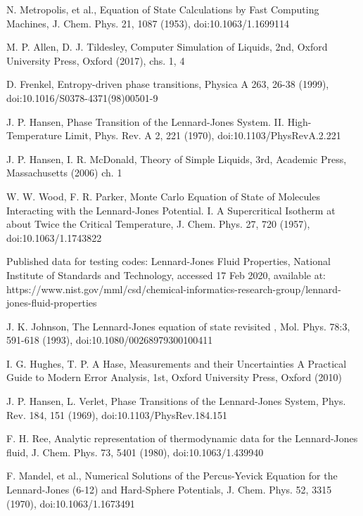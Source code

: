 \documentclass[10pt, twocolumn]{revtex4}    %
\begin{document}
\begin{thebibliography}{}




 N. Metropolis, et al., Equation of State Calculations by Fast Computing Machines, J. Chem. Phys. 21, 1087 (1953), doi:10.1063/1.1699114

 M. P. Allen, D. J. Tildesley, Computer Simulation of Liquids, 2nd, Oxford University Press, Oxford (2017), chs. 1, 4

 D. Frenkel, Entropy-driven phase transitions, Physica A 263, 26-38 (1999), doi:10.1016/S0378-4371(98)00501-9

 J. P. Hansen, Phase Transition of the Lennard-Jones System. II. High-Temperature Limit, Phys. Rev. A 2, 221 (1970), doi:10.1103/PhysRevA.2.221

 J. P. Hansen, I. R. McDonald, Theory of Simple Liquids, 3rd, Academic Press, Massachusetts (2006) ch. 1

 W. W. Wood, F. R. Parker, Monte Carlo Equation of State of Molecules Interacting with the Lennard-Jones Potential. I. A Supercritical Isotherm at about Twice the Critical Temperature, J. Chem. Phys. 27, 720 (1957), doi:10.1063/1.1743822

 Published data for testing codes: Lennard-Jones Fluid Properties, National Institute of Standards and Technology, accessed 17 Feb 2020, available at: https://www.nist.gov/mml/csd/chemical-informatics-research-group/lennard-jones-fluid-properties

 J. K. Johnson, The Lennard-Jones equation of state revisited , Mol. Phys. 78:3, 591-618 (1993), doi:10.1080/00268979300100411

I. G. Hughes, T. P. A Hase, Measurements and their Uncertainties A Practical Guide to Modern Error Analysis, 1st, Oxford University Press, Oxford (2010)

 J. P. Hansen, L. Verlet, Phase Transitions of the Lennard-Jones System, Phys. Rev. 184, 151 (1969), doi:10.1103/PhysRev.184.151

 F. H. Ree, Analytic representation of thermodynamic data for the Lennard-Jones fluid, J. Chem. Phys. 73, 5401 (1980), doi:10.1063/1.439940

 F. Mandel, et al., Numerical Solutions of the Percus-Yevick Equation for the Lennard-Jones (6-12) and Hard-Sphere Potentials, J. Chem. Phys. 52, 3315 (1970), doi:10.1063/1.1673491


\end{thebibliography} 
\end{document}
